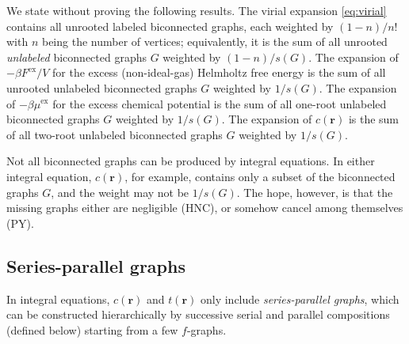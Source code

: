 \documentclass[notitlepage,preprint]{revtex4-1}
\newcommand{\vct}[1]{\mathbf{#1}}
\providecommand{\vr}{} %
\renewcommand{\vr}{\vct{r}}
\newcommand{\supex}[1]{ { { #1 }^{ \mathrm{ex} } } }
\newcommand{\Fex}{\supex{F}}
\newcommand{\muex}{\supex{\mu}}
\begin{document}
We state without proving the following results\cite{hansen, mayer, uhlenbeck1962}.
%
The virial expansion \eqref{eq:virial} contains
  all unrooted labeled biconnected graphs,
  each weighted by $(1-n)/n!$ with $n$ being the number of vertices;
%
equivalently, it is the sum of
  all unrooted \emph{unlabeled} biconnected graphs $G$
  weighted by $(1-n)/s(G)$.
%
The expansion of $-\beta \Fex/V$
  for the excess (non-ideal-gas) Helmholtz free energy
  is the sum of all unrooted unlabeled biconnected graphs $G$
  weighted by $1/s(G)$.
%
The expansion of $-\beta \muex$ for the excess chemical potential
  is the sum of all one-root unlabeled biconnected graphs $G$
  weighted by $1/s(G)$.
%
The expansion of $c(\vr)$ is the sum of
  all two-root unlabeled biconnected graphs $G$
  weighted by $1/s(G)$.
%



Not all biconnected graphs can be produced by integral equations.
%
In either integral equation,
  $c(\vr)$, for example, contains only a subset of the biconnected graphs $G$,
  and the weight may not be $1/s(G)$.
%
The hope, however, is that the missing graphs either are negligible (HNC),
  or somehow cancel among themselves (PY).





\subsection*{Series-parallel graphs}



In integral equations,
  $c(\vr)$ and $t(\vr)$
  only include
  \emph{series-parallel graphs},
%
which can be constructed
  hierarchically by successive
  serial and parallel compositions (defined below)
  starting from a few $f$-graphs\cite{eppstein1992}.
\end{document}
